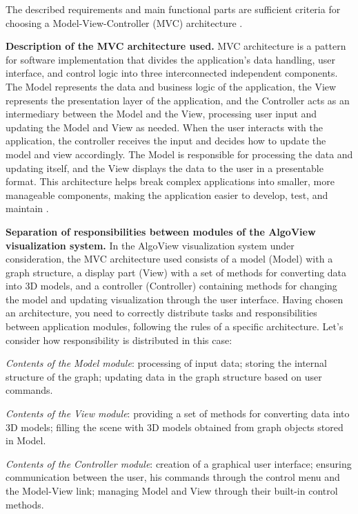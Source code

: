 The described requirements and main functional parts are sufficient criteria for choosing a Model-View-Controller (MVC) architecture \cite{m45}.

\textbf{Description of the MVC architecture used.} MVC architecture is a pattern for software implementation that divides the application's data handling, user interface, and control logic into three interconnected independent components. The Model represents the data and business logic of the application, the View represents the presentation layer of the application, and the Controller acts as an intermediary between the Model and the View, processing user input and updating the Model and View as needed. When the user interacts with the application, the controller receives the input and decides how to update the model and view accordingly. The Model is responsible for processing the data and updating itself, and the View displays the data to the user in a presentable format. This architecture helps break complex applications into smaller, more manageable components, making the application easier to develop, test, and maintain \cite{m46}.

\textbf{Separation of responsibilities between modules of the AlgoView visualization system.} In the AlgoView visualization system under consideration, the MVC architecture used consists of a model (Model) with a graph structure, a display part (View) with a set of methods for converting data into 3D models, and a controller (Controller) containing methods for changing the model and updating visualization through the user interface. Having chosen an architecture, you need to correctly distribute tasks and responsibilities between application modules, following the rules of a specific architecture. Let's consider how responsibility is distributed in this case:

\textit{Contents of the Model module}: processing of input data; storing the internal structure of the graph; updating data in the graph structure based on user commands.

\textit{Contents of the View module}: providing a set of methods for converting data into 3D models; filling the scene with 3D models obtained from graph objects stored in Model.

\textit{Contents of the Controller module}: creation of a graphical user interface; ensuring communication between the user, his commands through the control menu and the Model-View link; managing Model and View through their built-in control methods.